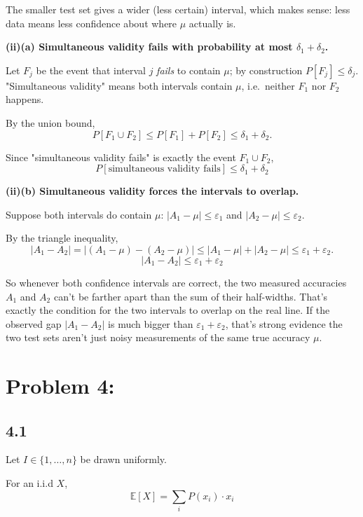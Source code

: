 \documentclass{article}
\begin{document}
\medskip
\noindent
The smaller test set gives a wider (less certain) interval, which makes sense: less data
means less confidence about where $\mu$ actually is.

\bigskip
\noindent
\textbf{(ii)(a) Simultaneous validity fails with probability at most $\delta_1+\delta_2$.}

\medskip
\noindent
Let $F_j$ be the event that interval $j$ \emph{fails} to contain $\mu$; by construction
$P[F_j] \le \delta_j$. "Simultaneous validity" means both intervals contain $\mu$, i.e.\
neither $F_1$ nor $F_2$ happens.

\medskip
\noindent
By the union bound,
\[
P[F_1 \cup F_2] \le P[F_1] + P[F_2] \le \delta_1 + \delta_2.
\]

\medskip
\noindent
Since "simultaneous validity fails" is exactly the event $F_1 \cup F_2$,
\[
\boxed{P[\text{simultaneous validity fails}] \le \delta_1 + \delta_2}
\]

\bigskip
\noindent
\textbf{(ii)(b) Simultaneous validity forces the intervals to overlap.}

\medskip
\noindent
Suppose both intervals do contain $\mu$: $|A_1 - \mu| \le \varepsilon_1$ and
$|A_2-\mu|\le \varepsilon_2$.

\medskip
\noindent
By the triangle inequality,
\[
|A_1 - A_2| = \big|(A_1-\mu) - (A_2-\mu)\big| \le |A_1-\mu| + |A_2-\mu| \le \varepsilon_1+\varepsilon_2.
\]
\[
\boxed{|A_1-A_2| \le \varepsilon_1+\varepsilon_2}
\]

\medskip
\noindent
So whenever both confidence intervals are correct, the two measured accuracies $A_1$ and
$A_2$ can't be farther apart than the sum of their half-widths. That's exactly the
condition for the two intervals to overlap on the real line. If the observed gap
$|A_1-A_2|$ is much bigger than $\varepsilon_1+\varepsilon_2$, that's strong evidence the
two test sets aren't just noisy measurements of the same true accuracy $\mu$.

\section*{Problem 4:}
\subsection*{4.1}

Let $I \in \{1, \ldots, n\}$ be drawn uniformly.

For an i.i.d $X$,
\[
\mathbb{E}[X] = \sum_i P(x_i) \cdot x_i
\]
\end{document}
